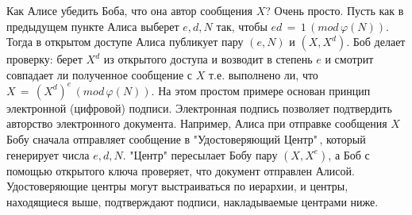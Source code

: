 Как Алисе убедить Боба, что она автор сообщения $X$? Очень просто. Пусть как в предыдущем пункте Алиса выберет $e, d, N$ так, чтобы $ed \, = \,1 \,(mod \, \varphi (N))$. Тогда в открытом доступе Алиса публикует пару $(e, N)$ и  $(X, X^d)$. Боб делает проверку: берет $X^d$ из открытого доступа и возводит в степень $e$ и смотрит совпадает ли полученное сообщение с $X$  т.е. выполнено ли, что $X \, = \, (X^d)^e \, (mod \, \varphi (N))$. На этом простом примере основан принцип электронной (цифровой) подписи. Электронная подпись позволяет подтвердить авторство электронного документа. Например, Алиса при отправке сообщения $X$ Бобу сначала отправляет сообщение в "Удостоверяющий Центр"\,, который генерирует числа $e, d, N$. "Центр" пересылает Бобу пару $(X, X^e)$, а Боб с помощью открытого ключа проверяет, что документ отправлен Алисой. Удостоверяющие центры могут выстраиваться по иерархии, и центры, находящиеся выше, подтверждают подписи, накладываемые центрами ниже.





